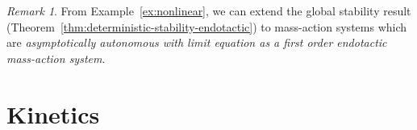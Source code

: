 \documentclass[10pt]{amsart}
\numberwithin{equation}{section}
\theoremstyle{plain}
\theoremstyle{definition}
\theoremstyle{remark}
\newtheorem{remark}[theorem]{Remark}
\begin{document}
\begin{remark}
    From Example~\ref{ex:nonlinear}, we can extend the global stability result (Theorem~\ref{thm:deterministic-stability-endotactic}) to mass-action systems which are \emph{asymptotically autonomous with limit equation as a first order endotactic mass-action system}.
\end{remark}







\appendix


\section{Kinetics}\label{subsect:kinetics}
\end{document}
